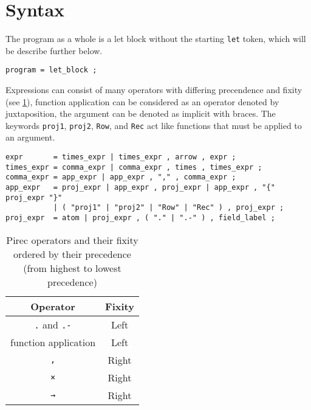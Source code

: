 \section{Syntax}\label{sec:syntax}

The program as a whole is a let block without the starting
\texttt{let} token, which will be describe further
below.
\begin{verbatim}
program = let_block ;
\end{verbatim}

Expressions can consist of many operators with differing precendence and fixity
(see \cref{tab:ops}), function application can be considered as an operator
denoted by juxtaposition, the argument can be denoted as implicit with braces.
The keywords \texttt{proj1},
\texttt{proj2}, \texttt{Row}, and \texttt{Rec} act like functions that
must be applied to an argument.
\begin{verbatim}
expr       = times_expr | times_expr , arrow , expr ;
times_expr = comma_expr | comma_expr , times , times_expr ;
comma_expr = app_expr | app_expr , "," , comma_expr ;
app_expr   = proj_expr | app_expr , proj_expr | app_expr , "{" proj_expr "}"
           | ( "proj1" | "proj2" | "Row" | "Rec" ) , proj_expr ;
proj_expr  = atom | proj_expr , ( "." | ".-" ) , field_label ;
\end{verbatim}

\begin{table}
  \centering
  \begin{tabular}{@{}cc@{}}
    \toprule
    Operator & Fixity \\\midrule
    \texttt{.} and
    \texttt{.-}
             & Left
    \\
    function application
             & Left
    \\
    \texttt{,}
             & Right
    \\
    \texttt{×}
             & Right
    \\
    \texttt{→}
             & Right
    \\\bottomrule
  \end{tabular}
  \caption[Pirec operators and their fixity sorted by their precedence]{Pirec
    operators and their fixity ordered by their precedence (from highest to
    lowest precedence)}\label{tab:ops}
\end{table}

